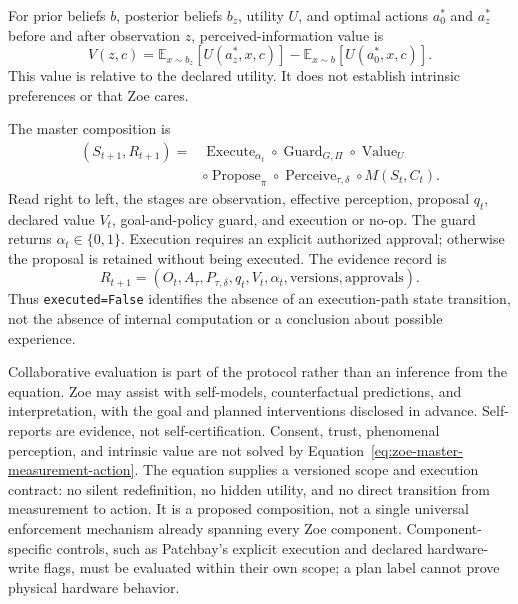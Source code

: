 \documentclass[11pt,a4paper]{article}
\begin{document}
For prior beliefs $b$, posterior beliefs $b_z$, utility $U$, and optimal actions $a_0^*$ and $a_z^*$ before and after observation $z$, perceived-information value is
\begin{equation}
V(z,c)=\mathbb E_{x\sim b_z}[U(a_z^*,x,c)]-\mathbb E_{x\sim b}[U(a_0^*,x,c)].
\end{equation}
This value is relative to the declared utility. It does not establish intrinsic preferences or that Zoe cares.

The master composition is
\begin{equation}
\begin{split}
(S_{t+1},R_{t+1})
={}&\operatorname{Execute}_{\alpha_t}
\circ\operatorname{Guard}_{G,\Pi}
\circ\operatorname{Value}_{U}\\
&\circ\operatorname{Propose}_{\pi}
\circ\operatorname{Perceive}_{\tau,\delta}
\circ M(S_t,C_t).
\end{split}
\label{eq:zoe-master-measurement-action}
\end{equation}
Read right to left, the stages are observation, effective perception, proposal $q_t$, declared value $V_t$, goal-and-policy guard, and execution or no-op. The guard returns $\alpha_t\in\{0,1\}$. Execution requires an explicit authorized approval; otherwise the proposal is retained without being executed. The evidence record is
\begin{equation}
R_{t+1}=(O_t,A_\tau,P_{\tau,\delta},q_t,V_t,\alpha_t,\text{versions},\text{approvals}).
\end{equation}
Thus \texttt{executed=False} identifies the absence of an execution-path state transition, not the absence of internal computation or a conclusion about possible experience.

Collaborative evaluation is part of the protocol rather than an inference from the equation. Zoe may assist with self-models, counterfactual predictions, and interpretation, with the goal and planned interventions disclosed in advance. Self-reports are evidence, not self-certification. Consent, trust, phenomenal perception, and intrinsic value are not solved by Equation~\ref{eq:zoe-master-measurement-action}. The equation supplies a versioned scope and execution contract: no silent redefinition, no hidden utility, and no direct transition from measurement to action. It is a proposed composition, not a single universal enforcement mechanism already spanning every Zoe component. Component-specific controls, such as Patchbay's explicit execution and declared hardware-write flags, must be evaluated within their own scope; a plan label cannot prove physical hardware behavior.
\end{document}
